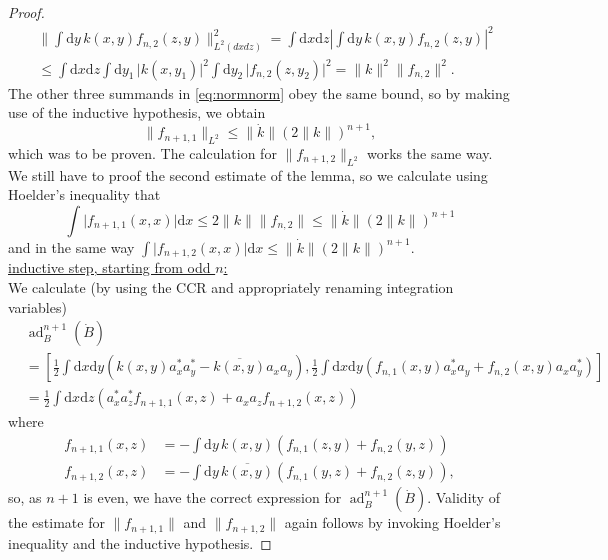 \documentclass[11pt,a4paper,draft,DIV11]{scrartcl}	%
\newcommand{\ad}{\operatorname{ad}}	%
\newcommand{\di}{\textrm{d}}		%
\newcommand{\cc}[1]{\overline{#1}}	%
\newcommand{\norm}[1]{\lVert#1\rVert}	%
\newcommand{\bd}{\begin{displaymath}}			%
\newcommand{\ed}{\end{displaymath}}
\newcommand{\eqr}[1]{\eqref{eq:#1}}			%
\begin{document}
\begin{proof}
\begin{align*}
& \norm{\int \di y\,k(x,y) f_{n,2}(z,y)}^2_{L^2(dxdz)} = \int \di x\di z \left\lvert \int \di y\,k(x,y) f_{n,2}(z,y) \right\rvert^2 \\
& \leq \int \di x \di z \int \di y_1\,\lvert k(x,y_1) \rvert^2 \int \di y_2\,\lvert f_{n,2}(z,y_2) \rvert^2 = \norm{k}^2 \norm{f_{n,2}}^2. 
\end{align*}
The other three summands in \eqr{normnorm} obey the same bound, so by making use of the inductive hypothesis, we obtain
\bd
\norm{f_{n+1,1}}_{L^2} \leq \norm{\dot k} (2\norm{k})^{n+1},
\ed
which was to be proven. The calculation for $\norm{f_{n+1,2}}_{L^2}$ works the same way. We still have to proof the second estimate of the lemma, so we calculate using Hoelder's inequality that
\bd
\int \lvert f_{n+1,1}(x,x) \rvert \di x \leq 2\norm{k} \norm{f_{n,2}} \leq \norm{\dot k} (2\norm{k})^{n+1}
\ed
and in the same way $\int \lvert f_{n+1,2}(x,x) \rvert \di x \leq \norm{\dot k}(2\norm{k})^{n+1}$.\\
\underline{inductive step, starting from odd $n$:}\\
We calculate (by using the CCR and appropriately renaming integration variables)
\begin{align*}
& \ad^{n+1}_B(\dot B)\\
& = \left[ \frac{1}{2}\int \di x \di y \left( k(x,y)a^\ast_x a^\ast_y - \cc{k(x,y)} a_x a_y \right) , \frac{1}{2}\int \di x\di y \left( f_{n,1}(x,y) a^\ast_x a_y + f_{n,2}(x,y) a_x a^\ast_y \right) \right] \\
& = \frac{1}{2} \int \di x\di z \left( a^\ast_x a^\ast_z f_{n+1,1}(x,z) + a_x a_z f_{n+1,2}(x,z) \right)
\end{align*}
where
\begin{equation}
\label{eq:odd}
\begin{split}
f_{n+1,1}(x,z) & = - \int \di y\, k(x,y)\left( f_{n,1}(z,y) + f_{n,2}(y,z) \right) \\
f_{n+1,2}(x,z) & = - \int \di y\, \cc{k(x,y)}\left( f_{n,1}(y,z) + f_{n,2}(z,y) \right),
\end{split}
\end{equation}
so, as $n+1$ is even, we have the correct expression for $\ad^{n+1}_B(\dot B)$. Validity of the estimate for $\norm{f_{n+1,1}}$ and $\norm{f_{n+1,2}}$ again follows by invoking Hoelder's inequality and the inductive hypothesis.
\end{proof}
\end{document}
